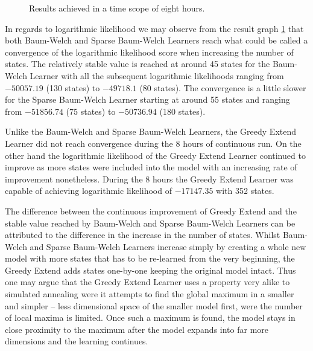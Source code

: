 \begin{figure}
	\centering
	\caption{Results achieved in a time scope of eight hours.}
	\label{fig:eight_hour_run}
\end{figure}

In regards to logarithmic likelihood we may observe from the result graph \ref{fig:eight_hour_run} that both Baum-Welch and Sparse Baum-Welch Learners reach what could be called a convergence of the logarithmic likelihood score when increasing the number of states. The relatively stable value is reached at around 45 states for the Baum-Welch Learner with all the subsequent logarithmic likelihoods ranging from $-50057.19$ (130 states) to $-49718.1$ (80 states). The convergence is a little slower for the Sparse Baum-Welch Learner starting at around 55 states and ranging from $-51856.74$ (75 states) to $-50736.94$ (180 states).

Unlike the Baum-Welch and Sparse Baum-Welch Learners, the Greedy Extend Learner did not reach convergence during the 8 hours of continuous run. On the other hand the logarithmic likelihood of the Greedy Extend Learner continued to improve as more states were included into the model with an increasing rate of improvement nonetheless. During the 8 hours the Greedy Extend Learner was capable of achieving logarithmic likelihood of $-17147.35$ with 352 states.

The difference between the continuous improvement of Greedy Extend and the stable value reached by Baum-Welch and Sparse Baum-Welch Learners can be attributed to the difference in the increase in the number of states. Whilst Baum-Welch and Sparse Baum-Welch Learners increase simply by creating a whole new model with more states that has to be re-learned from the very beginning, the Greedy Extend adds states one-by-one keeping the original model intact. Thus one may argue that the Greedy Extend Learner uses a property very alike to simulated annealing were it attempts to find the global maximum in a smaller and simpler -- less dimensional space of the smaller model first, were the number of local maxima is limited. Once such a maximum is found, the model stays in close proximity to the maximum after the model expands into far more dimensions and the learning continues.

